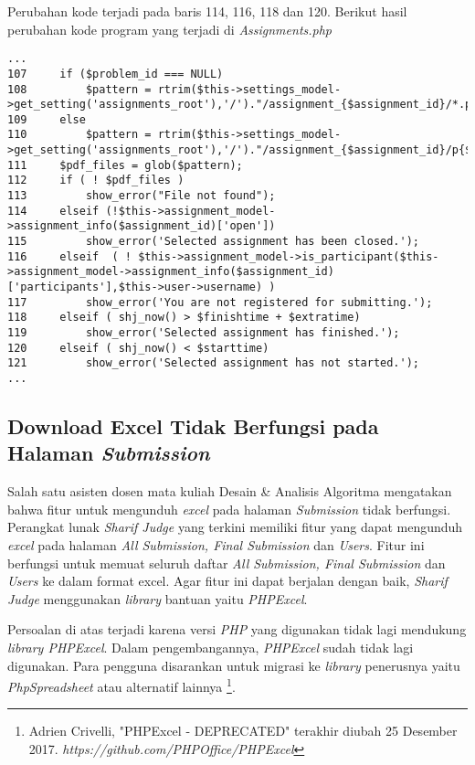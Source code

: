 	Perubahan kode terjadi pada baris 114, 116, 118 dan 120. Berikut hasil perubahan kode program yang terjadi di \textit{Assignments.php}
\begin{lstlisting}[basicstyle=\ttfamily, frame=single,
columns=fullflexible, keepspaces=true, breaklines=true]
...
107		if ($problem_id === NULL)
108			$pattern = rtrim($this->settings_model->get_setting('assignments_root'),'/')."/assignment_{$assignment_id}/*.pdf";
109		else
110			$pattern = rtrim($this->settings_model->get_setting('assignments_root'),'/')."/assignment_{$assignment_id}/p{$problem_id}/*.pdf";
111		$pdf_files = glob($pattern);
112		if ( ! $pdf_files )
113			show_error("File not found");
114		elseif (!$this->assignment_model->assignment_info($assignment_id)['open'])
115			show_error('Selected assignment has been closed.');
116		elseif	( ! $this->assignment_model->is_participant($this->assignment_model->assignment_info($assignment_id)['participants'],$this->user->username) )
117			show_error('You are not registered for submitting.');
118		elseif ( shj_now() > $finishtime + $extratime)
119			show_error('Selected assignment has finished.');
120		elseif ( shj_now() < $starttime)
121			show_error('Selected assignment has not started.');
...
\end{lstlisting}

	\subsection{Download Excel Tidak Berfungsi pada Halaman \textit{Submission}}
	Salah satu asisten dosen mata kuliah Desain \& Analisis Algoritma mengatakan bahwa fitur untuk mengunduh \textit{excel} pada halaman \textit{Submission} tidak berfungsi. Perangkat lunak \textit{Sharif Judge} yang terkini memiliki fitur yang dapat mengunduh \textit{excel} pada halaman \textit{All Submission, Final Submission} dan \textit{Users}. Fitur ini berfungsi untuk memuat seluruh daftar \textit{All Submission, Final Submission} dan \textit{Users} ke dalam format excel. Agar fitur ini dapat berjalan dengan baik, \textit{Sharif Judge} menggunakan \textit{library} bantuan yaitu \textit{PHPExcel}.
	
	Persoalan di atas terjadi karena versi \textit{PHP} yang digunakan tidak lagi mendukung \textit{library PHPExcel}. Dalam pengembangannya, \textit{PHPExcel} sudah tidak lagi digunakan. Para pengguna disarankan untuk migrasi ke \textit{library} penerusnya yaitu \textit{PhpSpreadsheet} atau alternatif lainnya \footnote{Adrien Crivelli, "PHPExcel - DEPRECATED" terakhir diubah 25 Desember 2017. \textit{https://github.com/PHPOffice/PHPExcel}}.
	
